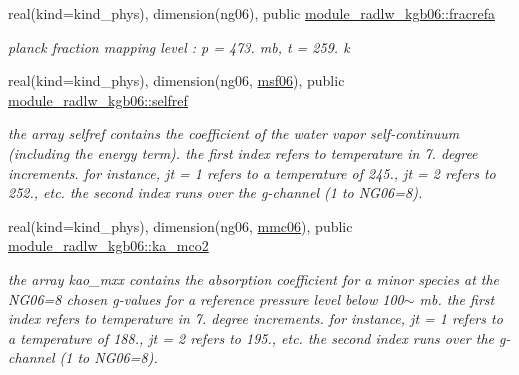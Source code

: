 \begin{DoxyCompactItemize}
\mbox{\label{group__module__radlw__kgbnn_ga1354ecbc5f07cd763847333e680c686a}} 
real(kind=kind\+\_\+phys), dimension(ng06), public \hyperlink{group__module__radlw__kgbnn_ga1354ecbc5f07cd763847333e680c686a}{module\+\_\+radlw\+\_\+kgb06\+::fracrefa}
\begin{DoxyCompactList}\small\item\em planck fraction mapping level \+: p = 473. mb, t = 259. k \end{DoxyCompactList}\item 
\mbox{\label{group__module__radlw__kgbnn_ga98901725947a4477924a47af5e67277e}} 
real(kind=kind\+\_\+phys), dimension(ng06, \hyperlink{group__module__radlw__kgbnn_ga65f808aeb87457d383dd7f9366878fb9}{msf06}), public \hyperlink{group__module__radlw__kgbnn_ga98901725947a4477924a47af5e67277e}{module\+\_\+radlw\+\_\+kgb06\+::selfref}
\begin{DoxyCompactList}\small\item\em the array selfref contains the coefficient of the water vapor self-\/continuum (including the energy term). the first index refers to temperature in 7. degree increments. for instance, jt = 1 refers to a temperature of 245., jt = 2 refers to 252., etc. the second index runs over the g-\/channel (1 to N\+G06=8). \end{DoxyCompactList}\item 
\mbox{\label{group__module__radlw__kgbnn_gadb5dab732383b82e89f1048ab5150c23}} 
real(kind=kind\+\_\+phys), dimension(ng06, \hyperlink{group__module__radlw__kgbnn_gaf7a377cb66fd48348789c20f5a31dec6}{mmc06}), public \hyperlink{group__module__radlw__kgbnn_gadb5dab732383b82e89f1048ab5150c23}{module\+\_\+radlw\+\_\+kgb06\+::ka\+\_\+mco2}
\begin{DoxyCompactList}\small\item\em the array kao\+\_\+mxx contains the absorption coefficient for a minor species at the N\+G06=8 chosen g-\/values for a reference pressure level below 100$\sim$ mb. the first index refers to temperature in 7. degree increments. for instance, jt = 1 refers to a temperature of 188., jt = 2 refers to 195., etc. the second index runs over the g-\/channel (1 to N\+G06=8). \end{DoxyCompactList}\end{DoxyCompactItemize}
